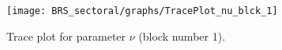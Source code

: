 \begin{figure}[H]
\centering
  \texttt{[image: BRS\_sectoral/graphs/TracePlot\_nu\_blck\_1]}\\
    \caption{Trace plot for parameter $\nu$ (block number 1).}
\end{figure}
